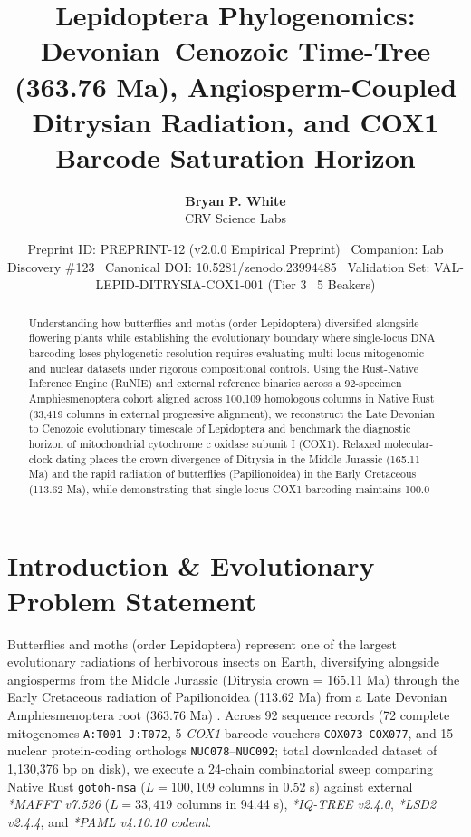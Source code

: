 \documentclass[10pt,letterpaper]{article}
\title{\textbf{Lepidoptera Phylogenomics: Devonian–Cenozoic Time-Tree (363.76 Ma), Angiosperm-Coupled Ditrysian Radiation, and COX1 Barcode Saturation Horizon}}
\author{\textbf{Bryan P. White}\\CRV Science Labs}
\date{Preprint ID: PREPRINT-12 (v2.0.0 Empirical Preprint) \textbullet\ Companion: Lab Discovery \#123 \textbullet\ Canonical DOI: 10.5281/zenodo.23994485 \textbullet\ Validation Set: VAL-LEPID-DITRYSIA-COX1-001 (Tier 3 \textbullet\ 5 Beakers)}
\begin{document}
\maketitle

\begin{abstract}
Understanding how butterflies and moths (order Lepidoptera) diversified alongside flowering plants while establishing the evolutionary boundary where single-locus DNA barcoding loses phylogenetic resolution requires evaluating multi-locus mitogenomic and nuclear datasets under rigorous compositional controls. Using the Rust-Native Inference Engine (RuNIE) and external reference binaries across a 92-specimen Amphiesmenoptera cohort aligned across 100,109 homologous columns in Native Rust (33,419 columns in external progressive alignment), we reconstruct the Late Devonian to Cenozoic evolutionary timescale of Lepidoptera and benchmark the diagnostic horizon of mitochondrial cytochrome c oxidase subunit I (COX1). Relaxed molecular-clock dating places the crown divergence of Ditrysia in the Middle Jurassic (165.11 Ma) and the rapid radiation of butterflies (Papilionoidea) in the Early Cretaceous (113.62 Ma), while demonstrating that single-locus COX1 barcoding maintains 100.0%
\end{abstract}

\section{Introduction \& Evolutionary Problem Statement}
Butterflies and moths (order Lepidoptera) represent one of the largest evolutionary radiations of herbivorous insects on Earth, diversifying alongside angiosperms from the Middle Jurassic (Ditrysia crown = 165.11 Ma) through the Early Cretaceous radiation of Papilionoidea (113.62 Ma) from a Late Devonian Amphiesmenoptera root (363.76 Ma) \cite{white2026runie,kawahara2019pnas,kawahara2023natecolevol}. Across 92 sequence records (72 complete mitogenomes \texttt{A:T001}--\texttt{J:T072}, 5 \textit{COX1} barcode vouchers \texttt{COX073}--\texttt{COX077}, and 15 nuclear protein-coding orthologs \texttt{NUC078}--\texttt{NUC092}; total downloaded dataset of 1,130,376 bp on disk), we execute a 24-chain combinatorial sweep comparing Native Rust \texttt{gotoh-msa} ($L = 100,109$ columns in 0.52 s) against external \textit{*MAFFT v7.526} ($L = 33,419$ columns in 94.44 s), \textit{*IQ-TREE v2.4.0}, \textit{*LSD2 v2.4.4}, and \textit{*PAML v4.10.10 codeml}.
\end{document}
